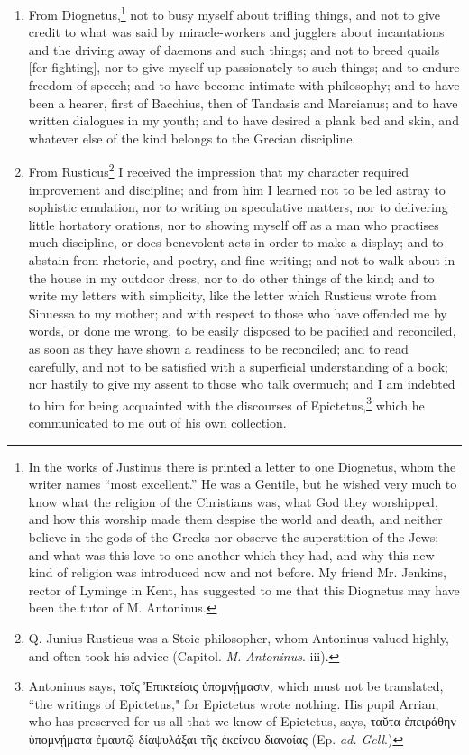 \begin{enumerate}
\item From Diognetus,\footnote{In the works of Justinus there is printed a letter to one Diognetus, whom the writer names ``most excellent.'' He was a Gentile, but he wished very much to know what the religion of the Christians was, what God they worshipped, and how this worship made them despise the world and death, and neither believe in the gods of the Greeks nor observe the superstition of the Jews; and what was this love to one another which they had, and why this new kind of religion was introduced now and not before. My friend Mr. Jenkins, rector of Lyminge in Kent, has suggested to me that this Diognetus may have been the tutor of M. Antoninus.} not to busy myself about trifling things, and not to give credit to what was said by miracle-workers and jugglers about incantations and the driving away of daemons and such things; and not to breed quails [{\clarify for fighting}], nor to give myself up passionately to such things; and to endure freedom of speech; and to have become intimate with philosophy; and to have been a hearer, first of Bacchius, then of Tandasis and Marcianus; and to have written dialogues in my youth; and to have desired a plank bed and skin, and whatever else of the kind belongs to the Grecian discipline. 

\item From Rusticus\footnote{Q. Junius Rusticus was a Stoic philosopher, whom Antoninus valued highly, and often took his advice (Capitol. \textit{M. Antoninus}. iii).} I received the impression that my character required improvement and discipline; and from him I learned not to be led astray to sophistic emulation, nor to writing on speculative matters, nor to delivering little hortatory orations, nor to showing myself off as a man who practises much discipline, or does benevolent acts in order to make a display; and to abstain from rhetoric, and poetry, and fine writing; and not to walk about in the house in my outdoor dress, nor to do other things of the kind; and to write my letters with simplicity, like the letter which Rusticus wrote from Sinuessa to my mother; and with respect to those who have offended me by words, or done me wrong, to be easily disposed to be pacified and reconciled, as soon as they have shown a readiness to be reconciled; and to read carefully, and not to be satisfied with a superficial understanding of a book; nor hastily to give my assent to those who talk overmuch; and I am indebted to him for being acquainted with the discourses of Epictetus,\footnote{Antoninus says, \textgreek{τοῐς Ἐπικτείοις ὑπομνῄμασιν}, which must not be translated, ``the writings of Epictetus," for Epictetus wrote nothing. His pupil Arrian, who has preserved for us all that we know of Epictetus, says, \textgreek{ταῠτα ἐπειράθην ὑπομνῄματα ἐμαυτῷ δίαψυλάξαι τῆς ἐκείνου διανοίας} (Ep. \textit{ad. Gell}.)} which he communicated to me out of his own collection. 


\end{enumerate}

